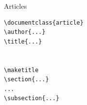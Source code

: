 \begin{frame}
\begin{columns}
\begin{column}{.58\textwidth}
\end{column}
\end{columns}

\begin{columns}
\begin{column}{.4\textwidth}
\begin{beamerboxesrounded}[width=\linewidth]{Articles}
\begin{lstlisting}[moretexcs={chapter,subsection,maketitle}, basicstyle={\ttfamily}, emph={article}]
\documentclass{article}
\author{...}
\title{...}


\maketitle
\section{...}
...
\subsection{...}


\end{lstlisting}
\end{beamerboxesrounded}
\end{column}
\end{columns}
\end{frame}
